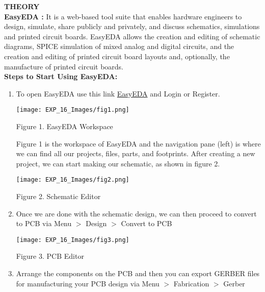 \documentclass[12pt,a4paper]{article}
\begin{document}
\begin{justify}
\textbf{\large THEORY}\\[3pt]
\textbf{EasyEDA :} It is a web-based tool suite that enables hardware engineers to design, simulate, share publicly and privately, and discuss schematics, simulations and printed circuit boards. EasyEDA allows the creation and editing of schematic diagrams, SPICE simulation of mixed analog and digital circuits, and the creation and editing of printed circuit board layouts and, optionally, the manufacture of printed circuit boards.\\[6pt]
\noindent \textbf{Steps to Start Using EasyEDA:}\\
\vspace{-6mm}
\begin{enumerate}
\setlength\itemsep{-0.3em}
  \item To open EasyEDA use this link \href{https://easyeda.com/editor}{EasyEDA} and Login or Register.
\begin{center} 
\texttt{[image: EXP\_16\_Images/fig1.png]}
\end{center}
\begin{center} {Figure 1. EasyEDA Workspace}\end{center}
  
Figure 1 is the workspace of EasyEDA and the navigation pane (left) is where we can find all our projects, files, parts, and footprints. After creating a new project, we can start making our schematic, as shown in figure 2.
\begin{center} 
\texttt{[image: EXP\_16\_Images/fig2.png]}
\end{center}
\begin{center} {Figure 2. Schematic Editor}\end{center}
 
\vspace{13cm}
  
  \item Once we are done with the schematic design, we can then proceed to convert to PCB via Menu $>$ Design $>$ Convert to PCB
  
 \begin{center} 
\texttt{[image: EXP\_16\_Images/fig3.png]}
\end{center}
\begin{center} {Figure 3. PCB Editor}\end{center}

  \item  Arrange the components on the PCB and then you can export GERBER files for manufacturing your PCB design via Menu $>$ Fabrication $>$ Gerber


\end{enumerate}
\end{justify}
\end{document}
